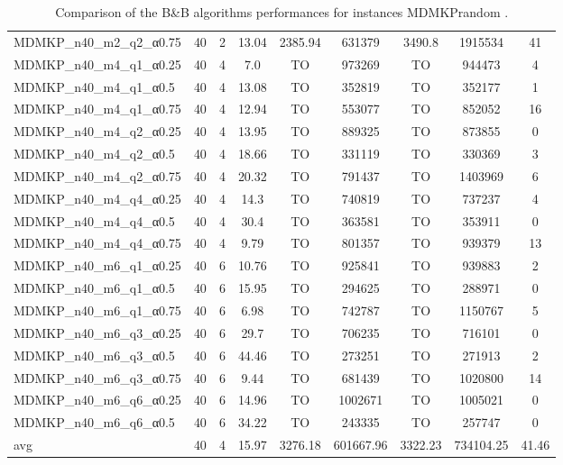 \begin{table}[!ht]
{\begin{tabular}{lcccccccc}
MDMKP\_n40\_m2\_q2\_α0.75 & 40 & 2 &  \textcolor{blue2}{13.04} & 2385.94 & 631379 & 3490.8 & 1915534 & 41 \\
MDMKP\_n40\_m4\_q1\_α0.25 & 40 & 4 &  \textcolor{blue2}{7.0} & TO & 973269 & TO & 944473 & 4 \\
MDMKP\_n40\_m4\_q1\_α0.5 & 40 & 4 &  \textcolor{blue2}{13.08} & TO & 352819 & TO & 352177 & 1 \\
MDMKP\_n40\_m4\_q1\_α0.75 & 40 & 4 &  \textcolor{blue2}{12.94} & TO & 553077 & TO & 852052 & 16 \\
MDMKP\_n40\_m4\_q2\_α0.25 & 40 & 4 &  \textcolor{blue2}{13.95} & TO & 889325 & TO & 873855 & 0 \\
MDMKP\_n40\_m4\_q2\_α0.5 & 40 & 4 &  \textcolor{blue2}{18.66} & TO & 331119 & TO & 330369 & 3 \\
MDMKP\_n40\_m4\_q2\_α0.75 & 40 & 4 &  \textcolor{blue2}{20.32} & TO & 791437 & TO & 1403969 & 6 \\
MDMKP\_n40\_m4\_q4\_α0.25 & 40 & 4 &  \textcolor{blue2}{14.3} & TO & 740819 & TO & 737237 & 4 \\
MDMKP\_n40\_m4\_q4\_α0.5 & 40 & 4 &  \textcolor{blue2}{30.4} & TO & 363581 & TO & 353911 & 0 \\
MDMKP\_n40\_m4\_q4\_α0.75 & 40 & 4 &  \textcolor{blue2}{9.79} & TO & 801357 & TO & 939379 & 13 \\
MDMKP\_n40\_m6\_q1\_α0.25 & 40 & 6 &  \textcolor{blue2}{10.76} & TO & 925841 & TO & 939883 & 2 \\
MDMKP\_n40\_m6\_q1\_α0.5 & 40 & 6 &  \textcolor{blue2}{15.95} & TO & 294625 & TO & 288971 & 0 \\
MDMKP\_n40\_m6\_q1\_α0.75 & 40 & 6 &  \textcolor{blue2}{6.98} & TO & 742787 & TO & 1150767 & 5 \\
MDMKP\_n40\_m6\_q3\_α0.25 & 40 & 6 &  \textcolor{blue2}{29.7} & TO & 706235 & TO & 716101 & 0 \\
MDMKP\_n40\_m6\_q3\_α0.5 & 40 & 6 &  \textcolor{blue2}{44.46} & TO & 273251 & TO & 271913 & 2 \\
MDMKP\_n40\_m6\_q3\_α0.75 & 40 & 6 &  \textcolor{blue2}{9.44} & TO & 681439 & TO & 1020800 & 14 \\
MDMKP\_n40\_m6\_q6\_α0.25 & 40 & 6 &  \textcolor{blue2}{14.96} & TO & 1002671 & TO & 1005021 & 0 \\
MDMKP\_n40\_m6\_q6\_α0.5 & 40 & 6 &  \textcolor{blue2}{34.22} & TO & 243335 & TO & 257747 & 0 \\
\cline{1-9} avg & 40 & 4 & 15.97 & 3276.18& 601667.96 & 3322.23& 734104.25 & 41.46\\ \cline{1-9}
\bottomrule
\end{tabular}
}%
\caption{Comparison of the B\&B algorithms performances for instances MDMKPrandom .}
\label{tab:table_EPSILONvsBBvsEPBBB_MDMKPrandom }
\end{table}

